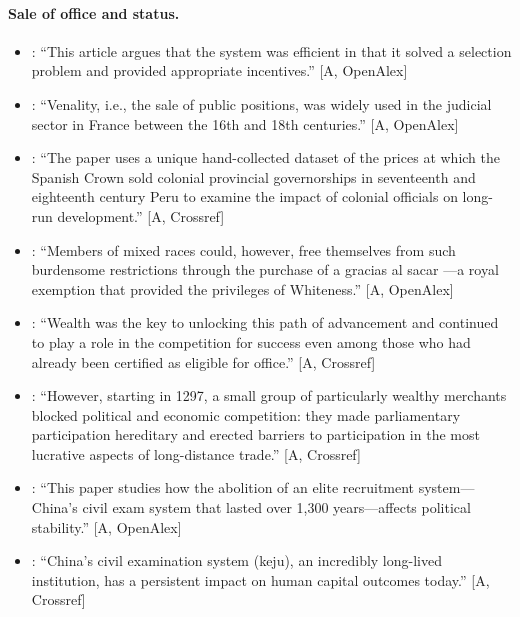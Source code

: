 \documentclass[11pt,a4paper]{article}
\newcommand{\aq}[2]{``#2''}
\begin{document}
\paragraph{Sale of office and status.}
\begin{itemize}
\item \citet{Allen1998}: \aq{Allen1998}{This article argues that the system was efficient in that it solved a selection problem and provided appropriate incentives.} [A, OpenAlex]
\item \citet{CrettezDeffainsMusyTallec2025}: \aq{CrettezDeffainsMusyTallec2025}{Venality, i.e., the sale of public positions, was widely used in the judicial sector in France between the 16th and 18th centuries.} [A, OpenAlex]
\item \citet{Guardado2018}: \aq{Guardado2018}{The paper uses a unique hand-collected dataset of the prices at which the Spanish Crown sold colonial provincial governorships in seventeenth and eighteenth century Peru to examine the impact of colonial officials on long-run development.} [A, Crossref]
\item \citet{Twinam2015}: \aq{Twinam2015}{Members of mixed races could, however, free themselves from such burdensome restrictions through the purchase of a gracias al sacar —a royal exemption that provided the privileges of Whiteness.} [A, OpenAlex]
\item \citet{Zhang2013}: \aq{Zhang2013}{Wealth was the key to unlocking this path of advancement and continued to play a role in the competition for success even among those who had already been certified as eligible for office.} [A, Crossref]
\item \citet{PugaTrefler2014}: \aq{PugaTrefler2014}{However, starting in 1297, a small group of particularly wealthy merchants blocked political and economic competition: they made parliamentary participation hereditary and erected barriers to participation in the most lucrative aspects of long-distance trade.} [A, Crossref]
\item \citet{BaiJia2016}: \aq{BaiJia2016}{This paper studies how the abolition of an elite recruitment system—China's civil exam system that lasted over 1,300 years—affects political stability.} [A, OpenAlex]
\item \citet{ChenKungMa2020}: \aq{ChenKungMa2020}{China's civil examination system (keju), an incredibly long-lived institution, has a persistent impact on human capital outcomes today.} [A, Crossref]
\end{itemize}
\end{document}
